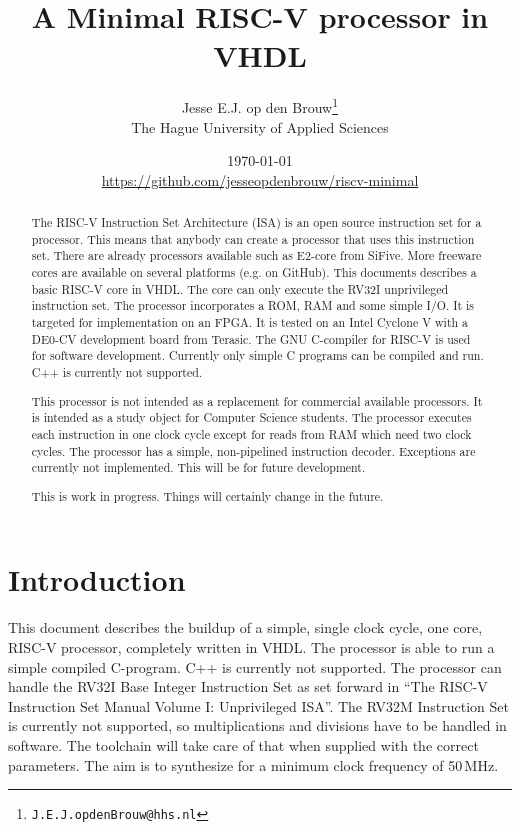 \documentclass[12pt]{article}
\author{Jesse E.J. op den Brouw\thanks{\texttt{J.E.J.opdenBrouw@hhs.nl}}\\[2ex]The Hague University of Applied Sciences}
\title{A Minimal RISC-V processor in VHDL}
\date{\today\\[2ex]\normalsize\url{https://github.com/jesseopdenbrouw/riscv-minimal}}
\begin{document}
\maketitle

\vfill
\begin{abstract}
\noindent
The RISC-V Instruction Set Architecture (ISA) is an open source instruction set for a processor. This means that anybody can create a processor that uses this instruction set. There are already processors available such as E2-core from SiFive. More freeware cores are available on several platforms (e.g. on GitHub). This documents describes a basic RISC-V core in VHDL. The core can only execute the RV32I unprivileged instruction set. The processor incorporates a ROM, RAM and some simple I/O. It is targeted for implementation on an FPGA. It is tested on an Intel Cyclone V with a DE0-CV development board from Terasic. The GNU C-compiler for RISC-V is used for software development. Currently only simple C programs can be compiled and run. C++ is currently not supported.

\noindent
This processor is not intended as a replacement for commercial available processors. It is intended as a study object for Computer Science students. The processor executes each instruction in one clock cycle except for reads from RAM which need two clock cycles. The processor has a simple, non-pipelined instruction decoder. Exceptions are currently not implemented. This will be for future development.

\noindent
This is work in progress. Things will certainly change in the future.
\end{abstract}
\vfill

\clearpage
\tableofcontents

\clearpage
\section{Introduction}
This document describes the buildup of a simple, single clock cycle, one core, RISC-V processor, completely written in VHDL. The processor is able to run a simple compiled C-program. C++ is currently not supported. The processor can handle the RV32I Base Integer Instruction Set as set forward in ``The RISC-V Instruction Set Manual Volume I: Unprivileged ISA''. The RV32M Instruction Set is currently not supported, so multiplications and divisions have to be handled in software. The toolchain will take care of that when supplied with the correct parameters. The aim is to synthesize for a minimum clock frequency of 50\,MHz.
\end{document}
